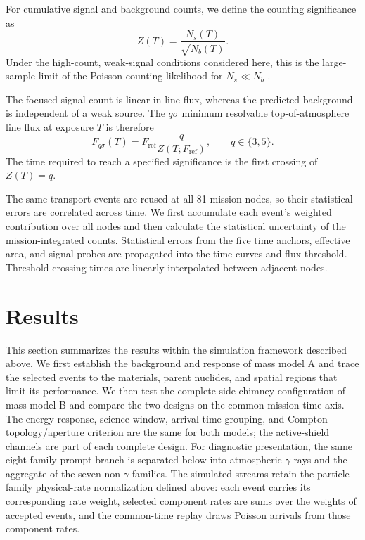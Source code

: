 \documentclass[11pt]{article}
\newcommand{\revblue}[1]{\textcolor{revisionblue}{#1}}
\newcommand{\fref}{F_{\mathrm{ref}}}
\begin{document}
For cumulative signal and background counts, we define the counting
significance as
\begin{equation}
 Z(T)=\frac{N_s(T)}{\sqrt{N_b(T)}}.
 \label{eq:mission_significance}
\end{equation}
Under the high-count, weak-signal conditions considered here, this is the
large-sample limit of the Poisson counting likelihood for $N_s\ll N_b$
\cite{Cowan2011}.

The focused-signal count is linear in line flux, whereas the predicted
background is independent of a weak source. The $q\sigma$ minimum resolvable
top-of-atmosphere line flux at exposure $T$ is therefore
\begin{equation}
 F_{q\sigma}(T)=\fref\frac{q}{Z(T;\fref)},
 \qquad q\in\{3,5\}.
 \label{eq:minimum_flux}
\end{equation}
The time required to reach a specified significance is the first crossing of
$Z(T)=q$.

The same transport events are reused at all 81 mission nodes, so their
statistical errors are correlated across time. We first accumulate each event's
weighted contribution over all nodes and then calculate the statistical
uncertainty of the mission-integrated counts. Statistical errors from the five
time anchors, effective area, and signal probes are propagated into the time
curves and flux threshold. Threshold-crossing times are linearly interpolated
between adjacent nodes.

\section{Results}
\label{sec:results}

This section summarizes the results within the simulation framework described above. We first establish the background and response of mass model A and trace the selected events to the materials, parent nuclides, and spatial regions that limit its performance. We then test the complete side-chimney configuration of mass model B and compare the two designs on the common mission time axis. The energy response, science window, arrival-time grouping, and Compton topology/aperture criterion are the same for both models; the active-shield channels are part of each complete design. \revblue{For diagnostic presentation, the same eight-family prompt branch is separated below into atmospheric $\gamma$ rays and the aggregate of the seven non-$\gamma$ families. The simulated streams retain the particle-family physical-rate normalization defined above: each event carries its corresponding rate weight, selected component rates are sums over the weights of accepted events, and the common-time replay draws Poisson arrivals from those component rates.}
\end{document}
